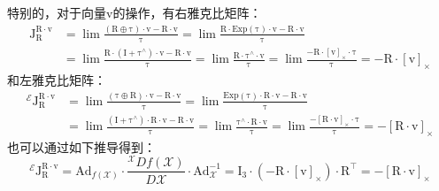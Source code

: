 \documentclass[12pt, onecolumn]{article}
\newcommand\skewmat[1]{\left[ #1 \right]_\times}
\newcommand\liehat[1]{#1^{\land}}
\newcommand\Exp[1]{\mathrm{Exp}\left( #1\right) }
\newcommand\bsm[1]{\boldsymbol{\mathrm{#1}}}
\begin{document}
	特别的，对于向量$\bsm{v}$的操作，有右雅克比矩阵：
	\begin{equation}
	\begin{aligned}
	\bsm{J}_{\bsm{R}}^{\bsm{R}\cdot\bsm{v}}&=
	\lim\frac{\left( \bsm{R}\oplus\bsm{\tau}\right) \cdot\bsm{v}- \bsm{R}\cdot\bsm{v}}{\bsm{\tau}}=
	\lim\frac{\bsm{R}\cdot\Exp{\bsm{\tau}} \cdot\bsm{v}- \bsm{R}\cdot\bsm{v}}{\bsm{\tau}}
	\\
	&=\lim\frac{\bsm{R}\cdot\left( \bsm{I}+\liehat{\bsm{\tau}}\right)  \cdot\bsm{v}- \bsm{R}\cdot\bsm{v}}{\bsm{\tau}}
	=\lim\frac{\bsm{R}\cdot\liehat{\bsm{\tau}}  \cdot\bsm{v}}{\bsm{\tau}}
	=\lim\frac{-\bsm{R}\cdot\skewmat{\bsm{v}}  \cdot\bsm{\tau}}{\bsm{\tau}}
	=-\bsm{R}\cdot\skewmat{\bsm{v}}
	\end{aligned}
	\end{equation}
	和左雅克比矩阵：
	\begin{equation}
	\begin{aligned}
	^\mathcal{E}\bsm{J}_{\bsm{R}}^{\bsm{R}\cdot\bsm{v}}&=
	\lim\frac{\left( \bsm{\tau}\oplus\bsm{R}\right) \cdot\bsm{v}- \bsm{R}\cdot\bsm{v}}{\bsm{\tau}}=
	\lim\frac{\Exp{\bsm{\tau}} \cdot\bsm{R}\cdot\bsm{v}- \bsm{R}\cdot\bsm{v}}{\bsm{\tau}}
	\\
	&=\lim\frac{\left( \bsm{I}+\liehat{\bsm{\tau}}\right)  \cdot\bsm{R}\cdot\bsm{v}- \bsm{R}\cdot\bsm{v}}{\bsm{\tau}}
	=\lim\frac{\liehat{\bsm{\tau}}  \cdot\bsm{R}\cdot\bsm{v}}{\bsm{\tau}}
	=\lim\frac{-\skewmat{\bsm{R}\cdot\bsm{v}}\cdot\bsm{\tau}}{\bsm{\tau}}
	=-\skewmat{\bsm{R}\cdot\bsm{v}}
	\end{aligned}
	\end{equation}
	也可以通过如下推导得到：
	\begin{equation}
	^\mathcal{E}\bsm{J}_{\bsm{R}}^{\bsm{R}\cdot\bsm{v}}=
	\bsm{Ad}_{f(\mathcal{X})}\cdot\frac{{^\mathcal{X}Df(\mathcal{X})}}{D\mathcal{X}}
		\cdot\bsm{Ad}_{\mathcal{X}}^{-1}
		=\bsm{I}_3\cdot\left(-\bsm{R}\cdot\skewmat{\bsm{v}} \right) \cdot \bsm{R}^\top
		=-\skewmat{\bsm{R}\cdot\bsm{v}}
	\end{equation}
\end{document}
